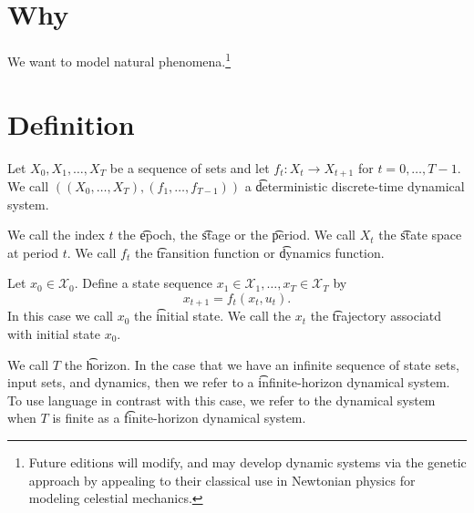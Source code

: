 
\section*{Why}

We want to model natural phenomena.\footnote{Future editions will modify, and may develop dynamic systems via the genetic approach by appealing to their classical use in Newtonian physics for modeling celestial mechanics.}

\section*{Definition}

Let $X_0, X_1, \dots , X_T$ be a sequence of sets and let $f_t: X_t \to X_{t+1}$ for $t = 0, \dots , T-1$.
We call $((X_0, \dots , X_T), (f_1, \dots , f_{T-1}))$ a \t{deterministic discrete-time dynamical system}.

We call the index $t$ the \t{epoch}, the \t{stage} or the \t{period}.
We call $X_t$ the \t{state space} at period $t$.
We call $f_t$ the \t{transition function} or \t{dynamics function}.

Let $x_0 \in \mathcal{X} _0$. Define a state sequence $x_1 \in \mathcal{X} _1, \dots , x_T \in \mathcal{X} _T$ by
\[
x_{t+1} = f_t(x_t, u_t).
\]
In this case we call $x_0$ the \t{initial state}.
We call the $x_t$ the \t{trajectory} associatd with initial state $x_0$.

We call $T$ the \t{horizon}.
In the case that we have an infinite sequence of state sets, input sets, and dynamics, then we refer to a \t{infinite-horizon} dynamical system.
To use language in contrast with this case, we refer to the dynamical system when $T$ is finite as a \t{finite-horizon} dynamical system.

\blankpage